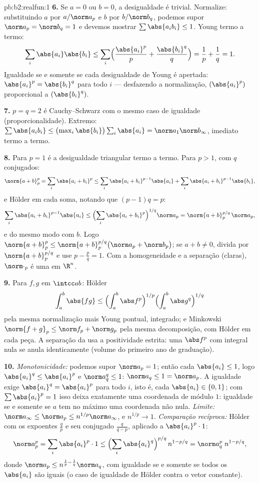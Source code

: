 \begin{solution}{pb:b2:realfun:1}
\textbf{6.} Se $a = 0$ ou $b = 0$, a desigualdade é trivial.
Normalize: substituindo $a$ por $a/\norm a_p$ e $b$ por $b/\norm
b_q$, podemos supor $\norm a_p = \norm b_q = 1$ e devemos mostrar
$\sum\abs{a_ib_i} \leq 1$. Young termo a termo:
\[
\sum_i\abs{a_i}\abs{b_i} \leq
\sum_i\Bigl(\frac{\abs{a_i}^p}{p} +
\frac{\abs{b_i}^q}{q}\Bigr) = \frac1p + \frac1q = 1 .
\]
Igualdade se e somente se cada desigualdade de Young é apertada: $\abs{a_i}^p =
\abs{b_i}^q$ para todo $i$ --- desfazendo a normalização,
$(\abs{a_i}^p)$ proporcional a $(\abs{b_i}^q)$.

\textbf{7.} $p = q = 2$ é Cauchy--Schwarz com o mesmo
caso de igualdade (proporcionalidade). Extremo: $\sum\abs{a_ib_i}
\leq \bigl(\max_i\abs{b_i}\bigr)\sum_i\abs{a_i} =
\norm a_1\norm b_\infty$, imediato termo a termo.

\textbf{8.} Para $p = 1$ é a desigualdade triangular termo a termo.
Para $p > 1$, com $q$ conjugados:
\[
\norm{a+b}_p^p = \sum_i\abs{a_i + b_i}^p
\leq \sum_i\abs{a_i+b_i}^{p-1}\abs{a_i} +
\sum_i\abs{a_i+b_i}^{p-1}\abs{b_i},
\]
e Hölder em cada soma, notando que $(p - 1)q = p$:
\[
\sum_i\abs{a_i+b_i}^{p-1}\abs{a_i} \leq
\Bigl(\sum_i\abs{a_i+b_i}^{p}\Bigr)^{1/q}\norm a_p
= \norm{a + b}_p^{p/q}\,\norm a_p ,
\]
e do mesmo modo com $b$. Logo $\norm{a+b}_p^p \leq \norm{a +
b}_p^{p/q}\bigl(\norm a_p + \norm b_p\bigr)$; se $a + b \neq 0$,
divida por $\norm{a+b}_p^{p/q}$ e use $p - \frac pq = 1$. Com
a homogeneidade e a separação (claras), $\norm\cdot_p$ é uma  em
$\R^n$.

\textbf{9.} Para $f, g$  em $\intcc ab$: Hölder
\[
\int_a^b\abs{fg} \leq \Bigl(\int_a^b\abs
f^p\Bigr)^{1/p}\Bigl(\int_a^b\abs g^q\Bigr)^{1/q}
\]
pela mesma normalização mais Young pontual, integrado; e
Minkowski $\norm{f + g}_p \leq \norm f_p + \norm g_p$ pela
mesma decomposição, com Hölder em cada peça. A separação da 
usa a positividade estrita: uma $\abs f^p$  com integral
nula se anula identicamente (volume do primeiro ano de graduação).

\textbf{10.} \emph{Monotonicidade:} podemos supor $\norm a_p = 1$;
então cada $\abs{a_i} \leq 1$, logo $\abs{a_i}^q \leq \abs{a_i}^p$
e $\norm a_q^q \leq 1$: $\norm a_q \leq 1 = \norm a_p$.
A igualdade exige $\abs{a_i}^q = \abs{a_i}^p$ para todo $i$,
isto é, cada $\abs{a_i} \in \{0, 1\}$; com $\sum\abs{a_i}^p = 1$
isso deixa exatamente uma coordenada de módulo $1$: igualdade se e somente se
$a$ tem no máximo uma coordenada não nula. \emph{Limite:} $\norm a_\infty \leq
\norm a_p \leq n^{1/p}\norm a_\infty$, e $n^{1/p} \to 1$.
\emph{Comparação recíproca:} Hölder com os expoentes $\frac
qp$ e seu conjugado $\frac{q}{q-p}$, aplicado a
$\abs{a_i}^p\cdot 1$:
\[
\norm a_p^p = \sum_i\abs{a_i}^p\cdot 1 \leq
\Bigl(\sum_i\abs{a_i}^{q}\Bigr)^{p/q}\,n^{1 - p/q}
= \norm a_q^{p}\; n^{1-p/q},
\]
donde $\norm a_p \leq n^{\frac1p - \frac1q}\norm a_q$, com
igualdade se e somente se todos os $\abs{a_i}$ são iguais (o caso de igualdade de
Hölder contra o vetor constante).


\end{solution}
